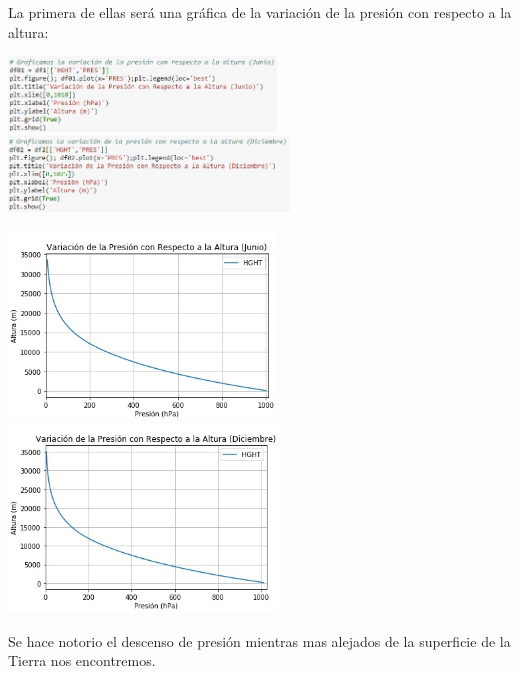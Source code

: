 \documentclass[12pt]{article}
\begin{document}
La primera de ellas será una gráfica de la variación de la presión con respecto a la altura:
\begin{center}
	\includegraphics[height=2cm]{dj1.jpg} \hspace*{\fill}
    \includegraphics[height=2cm]{dd1.jpg}
\end{center}
\begin{center}
	\includegraphics[height=5cm]{gj1.jpg}  \hspace*{\fill}
    \includegraphics[height=5cm]{gd1.jpg}
\end{center}
Se hace notorio el descenso de presión mientras mas alejados de la superficie de la Tierra nos encontremos.\\
\end{document}
